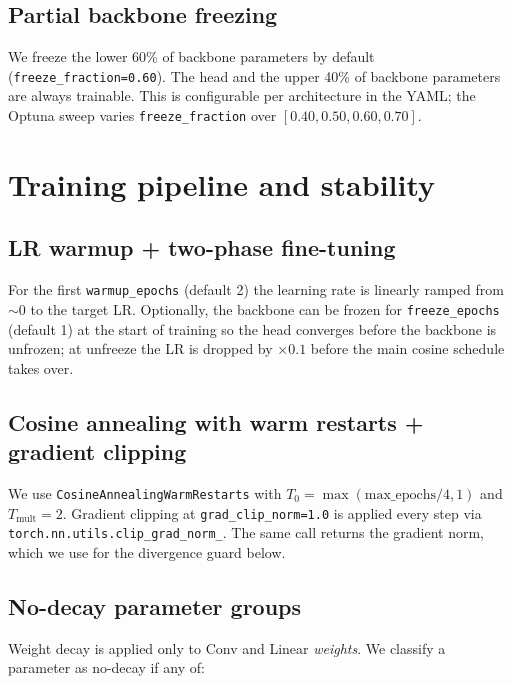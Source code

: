 \documentclass[10pt,a4paper]{article}
\begin{document}
\subsection{Partial backbone freezing}

We freeze the lower 60\% of backbone parameters by default
(\texttt{freeze\_fraction=0.60}). The head and the upper 40\% of
backbone parameters are always trainable. This is configurable per
architecture in the YAML; the Optuna sweep varies
\texttt{freeze\_fraction} over $[0.40, 0.50, 0.60, 0.70]$.

\section{Training pipeline and stability}

\subsection{LR warmup + two-phase fine-tuning}

For the first \texttt{warmup\_epochs} (default 2) the learning rate
is linearly ramped from $\sim 0$ to the target LR. Optionally, the
backbone can be frozen for \texttt{freeze\_epochs} (default 1) at the
start of training so the head converges before the backbone is
unfrozen; at unfreeze the LR is dropped by $\times 0.1$ before the
main cosine schedule takes over.

\subsection{Cosine annealing with warm restarts + gradient clipping}

We use \texttt{CosineAnnealingWarmRestarts} with
$T_0 = \max(\text{max\_epochs}/4, 1)$ and $T_{\text{mult}}=2$.
Gradient clipping at \texttt{grad\_clip\_norm=1.0} is applied every
step via \texttt{torch.nn.utils.clip\_grad\_norm\_}. The same call
returns the gradient norm, which we use for the divergence guard
below.

\subsection{No-decay parameter groups}

Weight decay is applied only to Conv and Linear \textit{weights}. We
classify a parameter as no-decay if any of:
\end{document}
